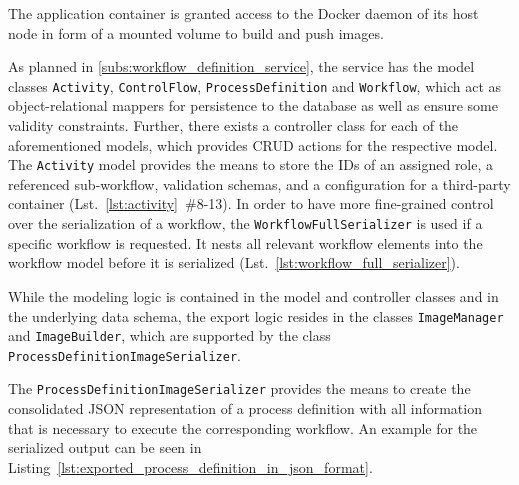     The application container is granted access to the Docker daemon of its host node in form of a mounted volume to build and push images.

    As planned in \ref{subs:workflow_definition_service}, the service has the model classes \texttt{Activity}, \texttt{ControlFlow}, \texttt{ProcessDefinition} and \texttt{Workflow}, which act as object-relational mappers for persistence to the database as well as ensure some validity constraints. Further, there exists a controller class for each of the aforementioned models, which provides \ac{CRUD} actions for the respective model. The \texttt{Activity} model provides the means to store the \acp{ID} of an assigned role, a referenced sub-workflow, validation schemas, and a configuration for a third-party container (Lst.~\ref{lst:activity}~\#8-13). In order to have more fine-grained control over the serialization of a workflow, the \texttt{WorkflowFullSerializer} is used if a specific workflow is requested. It nests all relevant workflow elements into the workflow model before it is serialized (Lst.~\ref{lst:workflow_full_serializer}).

    While the modeling logic is contained in the model and controller classes and in the underlying data schema, the export logic resides in the classes \texttt{ImageManager} and \texttt{ImageBuilder}, which are supported by the class \texttt{ProcessDefinitionImageSerializer}.

    The \texttt{ProcessDefinitionImageSerializer} provides the means to create the consolidated JSON representation of a process definition with all information that is necessary to execute the corresponding workflow. An example for the serialized output can be seen in Listing~\ref{lst:exported_process_definition_in_json_format}.

